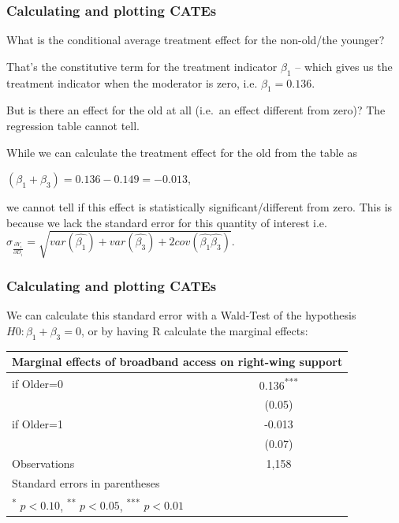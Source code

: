\documentclass[12pt,english,dvipsnames,aspectratio=169,handout]{beamer}\usepackage[]{graphicx}\usepackage[]{xcolor}
\begin{document}
\begin{frame}
  \frametitle{Calculating and plotting CATEs}
\footnotesize

What is the conditional average treatment effect for the non-old/the younger? 

That's the constitutive term for the treatment indicator $\beta_1$ -- which gives us the treatment indicator when the moderator is zero, i.e. $\beta_1 = 0.136$.

But is there an effect for the old at all (i.e.\ an effect different from zero)? The regression table cannot tell.

While we can calculate the treatment effect for the old from the table as 

\scriptsize
$(\beta_1 + \beta_3) = 0.136-0.149 = -0.013$\footnotesize, 

we cannot tell if this effect is statistically significant/different from zero. This is because we lack the standard error for this quantity of interest  i.e.\
\scriptsize
$\hat{\sigma}_{\frac{\partial Y_i}{\partial D_i}}= \sqrt{var(\hat{\beta_1}) + var(\hat{\beta_3}) + 2cov(\hat{\beta_1} \hat{\beta_3})}.$

\end{frame}


\begin{frame}
  \frametitle{Calculating and plotting CATEs}
\footnotesize
We can calculate this standard error with a Wald-Test of the hypothesis $H0: \beta_1 + \beta_3 = 0$, or by having R calculate the marginal effects:
\vspace{5mm}

\scriptsize
\centering
\begin{tabular}{l*{1}{c}}
\toprule
\multicolumn{2}{c}{Marginal effects of broadband access on right-wing support}\\
\midrule
if Older=0         &    0.136\textsuperscript{***}\\
                &   (0.05)         \\
if Older=1         &   -0.013         \\
                &   (0.07)         \\
\midrule
Observations    &     1,158         \\
\bottomrule
\multicolumn{2}{l}{Standard errors in parentheses}\\
\multicolumn{2}{l}{\textsuperscript{*} \(p<0.10\), \textsuperscript{**} \(p<0.05\), \textsuperscript{***} \(p<0.01\)}\\
\end{tabular}

\end{frame}
\end{document}
